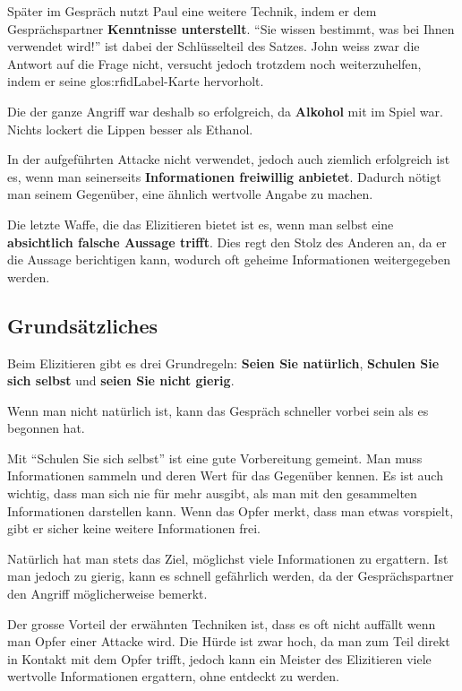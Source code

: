Später im Gespräch nutzt Paul eine weitere Technik, indem er dem Gesprächspartner \textbf{Kenntnisse unterstellt}. "`Sie wissen bestimmt, was bei Ihnen verwendet wird!"' ist dabei der Schlüsselteil des Satzes. John weiss zwar die Antwort auf die Frage nicht, versucht jedoch trotzdem noch weiterzuhelfen, indem er seine \gls{glos:rfidLabel}-Karte hervorholt.

Die der ganze Angriff war deshalb so erfolgreich, da \textbf{Alkohol} mit im Spiel war. Nichts lockert die Lippen besser als Ethanol.

In der aufgeführten Attacke nicht verwendet, jedoch auch ziemlich erfolgreich ist es, wenn man seinerseits \textbf{Informationen freiwillig anbietet}. Dadurch nötigt man seinem Gegenüber, eine ähnlich wertvolle Angabe zu machen.

Die letzte Waffe, die das Elizitieren bietet ist es, wenn man selbst eine \textbf{absichtlich falsche Aussage trifft}. Dies regt den Stolz des Anderen an, da er die Aussage berichtigen kann, wodurch oft geheime Informationen weitergegeben werden.

\subsection{Grundsätzliches}
Beim Elizitieren gibt es drei Grundregeln: \textbf{Seien Sie natürlich}, \textbf{Schulen Sie sich selbst} und \textbf{seien Sie nicht gierig}. 

Wenn man nicht natürlich ist, kann das Gespräch schneller vorbei sein als es begonnen hat. 

Mit "`Schulen Sie sich selbst"' ist eine gute Vorbereitung gemeint. Man muss Informationen sammeln und deren Wert für das Gegenüber kennen. Es ist auch wichtig, dass man sich nie für mehr ausgibt, als man mit den gesammelten Informationen darstellen kann. Wenn das Opfer merkt, dass man etwas vorspielt, gibt er sicher keine weitere Informationen frei.

Natürlich hat man stets das Ziel, möglichst viele Informationen zu ergattern. Ist man jedoch zu gierig, kann es schnell gefährlich werden, da der Gesprächspartner den Angriff möglicherweise bemerkt.

Der grosse Vorteil der erwähnten Techniken ist, dass es oft nicht auffällt wenn man Opfer einer Attacke wird. Die Hürde ist zwar hoch, da man zum Teil direkt in Kontakt mit dem Opfer trifft, jedoch kann ein Meister des Elizitieren viele wertvolle Informationen ergattern, ohne entdeckt zu werden.


